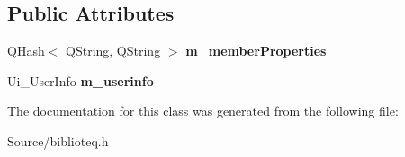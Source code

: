 \subsection*{Public Attributes}
\begin{DoxyCompactItemize}
\item 
Q\+Hash$<$ Q\+String, Q\+String $>$ {\bfseries m\+\_\+member\+Properties}\hypertarget{classuserinfo__diag__class_adf5b60bdacd18cd87fc70a956a63454b}{}\label{classuserinfo__diag__class_adf5b60bdacd18cd87fc70a956a63454b}

\item 
Ui\+\_\+\+User\+Info {\bfseries m\+\_\+userinfo}\hypertarget{classuserinfo__diag__class_a341e3da03b4472e1603b417323876995}{}\label{classuserinfo__diag__class_a341e3da03b4472e1603b417323876995}

\end{DoxyCompactItemize}


The documentation for this class was generated from the following file\+:\begin{DoxyCompactItemize}
\item 
Source/biblioteq.\+h\end{DoxyCompactItemize}

